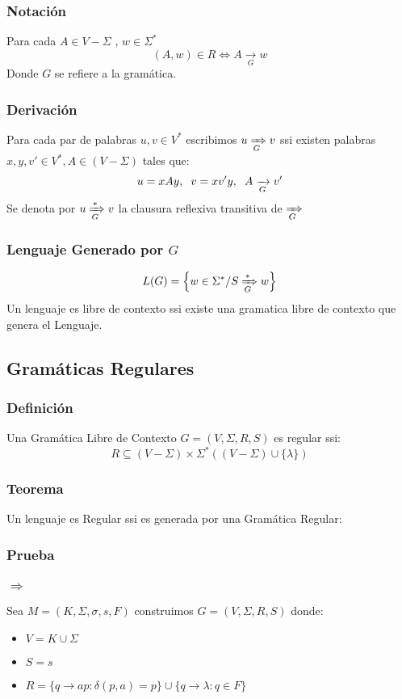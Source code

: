 \subsubsection{Notación}
Para cada $A\in V-\Sigma \text{ , } w\in\Sigma^*$
$$
(A,w)\in R \Leftrightarrow A \xrightarrow[G]{} w
$$
Donde $G$ se refiere a la gramática.
\subsubsection{Derivación}
Para cada par de palabras $u,v \in V^*$ escribimos $u \xRightarrow[G]{} v$ ssi existen palabras $x,y,v' \in V^*,A\in(V-\Sigma)$ tales que:
$$
u = xAy ,\hspace{0.2cm} v = xv' y ,\hspace{0.2cm} A \xrightarrow[G]{} v'
$$
Se denota por $u \xRightarrow[G]{*} v$ la clausura reflexiva transitiva de $\xRightarrow[G]{}$
\subsubsection{Lenguaje Generado por $G$}
$$
L(G) = \Big\{ w\in \Sigma^* / S \xRightarrow[G]{*} w \Big\} 
$$
Un lenguaje es libre de contexto ssi existe una gramatica libre de contexto que genera el Lenguaje.
\subsection{Gramáticas Regulares}
\subsubsection{Definición}
Una Gramática Libre de Contexto $G=(V,\Sigma,R,S)$ es regular ssi:
$$
R \subseteq (V-\Sigma)\times \Sigma^*((V-\Sigma)\cup \{ \lambda \} )
$$
\subsubsection{Teorema}
Un lenguaje es Regular ssi es generada por una Gramática Regular:
\subsubsection*{Prueba}
\subsubsection*{ $\Rightarrow$}
Sea $M=(K,\Sigma,\sigma,s,F)$ construimos $G=(V,\Sigma , R,S)$ donde:
\begin{itemize}
\item $V= K \cup \Sigma$
\item $S = s$
\item $R = \{ q \rightarrow ap : \delta(p,a)=p \} \cup \{ q \rightarrow \lambda : q\in F \}$
\end{itemize}
